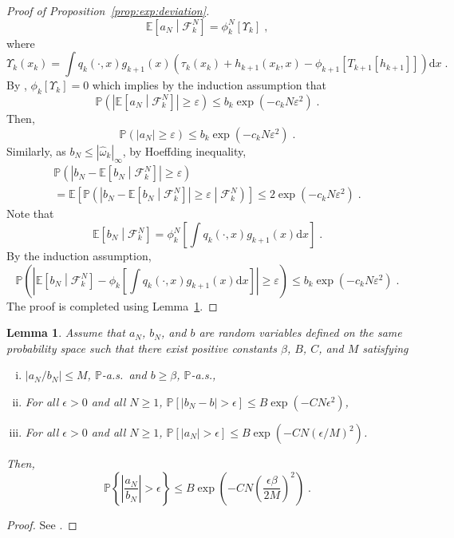 \documentclass[12pt]{article}
\newcommand{\rmd}{\mathrm{d}}
\newcommand{\eqsp}{\;}
\newcommand{\1}{\mathrm{1}}
\newtheorem{lemma}{Lemma}
\begin{document}
\begin{proof}[Proof of Proposition~\ref{prop:exp:deviation}]
\[\mathbb{E}\left[a_N\middle|\mathcal{F}_k^{N}\right] = \phi^N_{k}\left[\Upsilon_k\right] \eqsp,
\]
where
\[
\Upsilon_k(x_k) = \int q_{k}(\cdot,x)g_{k+1}(x)\left(\tau_k(x_k) + h_{k+1}(x_k,x) - \phi_{k+1}\left[T_{k+1}[h_{k+1}]\right]\right)\rmd x\eqsp.
\]
By \cite[Lemma~11]{olsson:westerborn:2016}, $\phi_{k}\left[\Upsilon_k\right] = 0$ which implies by the induction assumption that 
\[
\mathbb{P}\left(\left|\mathbb{E}\left[a_N\middle|\mathcal{F}_k^{N}\right]\right|\ge \varepsilon\right)\le b_k\exp\left(-c_kN\varepsilon^2\right)\eqsp.
\]
Then,
\[
\mathbb{P}\left(\left|a_N\right|\ge \varepsilon\right) \le b_k\exp\left(-c_kN\varepsilon^2\right)\eqsp.
\] 
Similarly, as $b_N \le |\widehat{\omega}_k|_{\infty}$, by Hoeffding inequality,
\begin{multline*}
\mathbb{P}\left(\left|b_N - \mathbb{E}\left[b_N\middle|\mathcal{F}_k^{N}\right]\right|\ge \varepsilon\right) \\
= \mathbb{E}\left[\mathbb{P}\left(\left|b_N - \mathbb{E}\left[b_N\middle|\mathcal{F}_k^{N}\right]\right|\ge \varepsilon\middle|\mathcal{F}_k^{N}\right)\right]\le 2\exp\left(-c_kN\varepsilon^2\right)\eqsp.
\end{multline*}
Note that
\[
\mathbb{E}\left[b_N\middle|\mathcal{F}_k^{N}\right] = \phi^N_{k}\left[\int q_{k}(\cdot,x)g_{k+1}(x)\rmd x\right]\eqsp.
\]
By  the induction assumption,
\[
\mathbb{P}\left(\left|\mathbb{E}\left[b_N\middle|\mathcal{F}_k^{N}\right]-\phi_k\left[\int q_{k}(\cdot,x)g_{k+1}(x)\rmd x\right]\right|\ge \varepsilon\right)\le b_k\exp\left(-c_kN\varepsilon^2\right)\eqsp.
\]
The proof is completed using Lemma~\ref{lem:hoeffding:ratio}.
\end{proof}


\begin{lemma}\label{lem:hoeffding:ratio}
Assume that $a_N$, $b_N$, and $b$ are random variables defined on the same probability space such that there exist positive constants $\beta$, $B$, $C$, and $M$ satisfying
\begin{enumerate}[(i)]
    \item $|a_N/b_N|\leq M$, $\mathbb{P}$-a.s.\ and  $b \geq \beta$, $\mathbb{P}$-a.s.,
    \item For all $\epsilon>0$ and all $N\geq1$, $\mathbb{P}\left[|b_N-b|>\epsilon \right]\leq B \exp\left(-C N \epsilon^2\right)$,
    \item For all $\epsilon>0$ and all $N\geq1$, $\mathbb{P} \left[ |a_N|>\epsilon \right]\leq B \exp\left(-C N \left(\epsilon/M\right)^2\right)$.
\end{enumerate}
Then,
$$
    \mathbb{P}\left\{ \left| \frac{a_N}{b_N} \right| > \epsilon \right\} \leq B \exp{\left(-C N \left(\frac{\epsilon \beta}{2M} \right)^2 \right)} \eqsp.
$$
\end{lemma}
\begin{proof}
See \cite{douc:garivier:moulines:olsson:2011}.
\end{proof}





\end{document}
